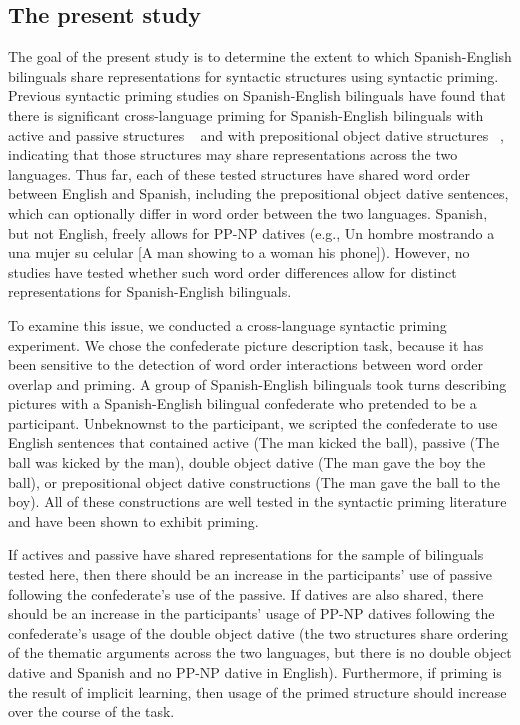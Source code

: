 \subsection{The present study}
\label{thepresentstudy}

The goal of the present study is to determine the extent to which Spanish-English bilinguals share representations for syntactic structures using syntactic priming. Previous syntactic priming studies on Spanish-English bilinguals have found that there is significant cross-language priming for Spanish-English bilinguals with active and passive structures ~\citep{Flett2003,Hartsuiker2004} and with prepositional object dative structures ~\citep{Flett2013,Meijer2003}, indicating that those structures may share representations across the two languages. Thus far, each of these tested structures have shared word order between English and Spanish, including the prepositional object dative sentences, which can optionally differ in word order between the two languages. Spanish, but not English, freely allows for PP-NP datives (e.g., Un hombre mostrando a una mujer su celular [A man showing to a woman his phone]). However, no studies have tested whether such word order differences allow for distinct representations for Spanish-English bilinguals. 

To examine this issue, we conducted a cross-language syntactic priming experiment. We chose the confederate picture description task, because it has been sensitive to the detection of word order interactions between word order overlap and priming. A group of Spanish-English bilinguals took turns describing pictures with a Spanish-English bilingual confederate who pretended to be a participant. Unbeknownst to the participant, we scripted the confederate to use English sentences that contained active (The man kicked the ball), passive (The ball was kicked by the man), double object dative (The man gave the boy the ball), or prepositional object dative constructions (The man gave the ball to the boy). All of these constructions are well tested in the syntactic priming literature and have been shown to exhibit priming. 

If actives and passive have shared representations for the sample of bilinguals tested here, then there should be an increase in the participants' use of passive following the confederate's use of the passive. If datives are also shared, there should be an increase in the participants' usage of PP-NP datives following the confederate's usage of the double object dative (the two structures share ordering of the thematic arguments across the two languages, but there is no double object dative and Spanish and no PP-NP dative in English). Furthermore, if priming is the result of implicit learning, then usage of the primed structure should increase over the course of the task. 

